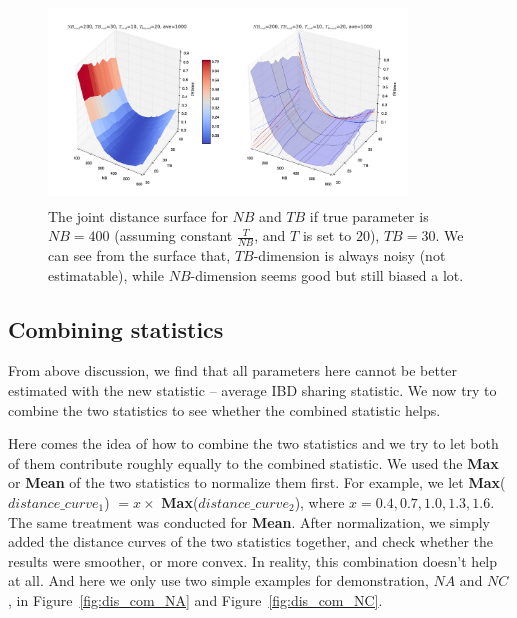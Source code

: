 \documentclass{bioinfo}
\begin{document}
\begin{figure}[h]
\centerline{\includegraphics[width=270pt, height=150pt]{like_NBTBT20_2.jpg}}
\caption{The joint distance surface for $NB$ and $TB$ if true parameter is $NB=400$ (assuming constant $\frac{T}{NB}$, and $T$ is set to $20$), $TB=30$. We can see from the surface that, $TB$-dimension is always noisy (not estimatable), while $NB$-dimension seems good but still biased a lot.}\label{fig:dis_NBTBT20}
\end{figure}



\subsection{Combining statistics}

From above discussion, we find that all parameters here cannot be better estimated with the new statistic -- average IBD sharing statistic. We now try to combine the two statistics to see whether the combined statistic helps.

Here comes the idea of how to combine the two statistics and we try to let both of them contribute roughly equally to the combined statistic. We used the \textbf{Max} or \textbf{Mean} of the two statistics to normalize them first. For example, we let \textbf{Max}($distance\_curve_1$) $=x\times $ \textbf{Max}($distance\_curve_2$), where $x=0.4,0.7,1.0,1.3,1.6$. The same treatment was conducted for \textbf{Mean}. After normalization, we simply added the distance curves of the two statistics together, and check whether the results were smoother, or more convex. In reality, this combination doesn't help at all. And here we only use two simple examples for demonstration, $NA$ and $NC$, in Figure~\ref{fig:dis_com_NA} and Figure~\ref{fig:dis_com_NC}.
\end{document}
